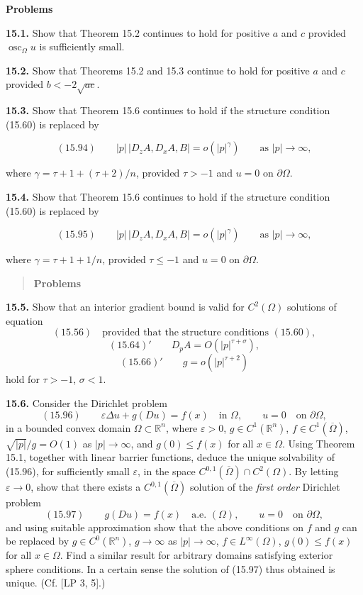 \textbf{Problems}

\medskip

\textbf{15.1.} Show that Theorem 15.2 continues to hold for positive $a$ and $c$ provided
$\operatorname{osc}_{\Omega} u$ is sufficiently small.

\medskip

\textbf{15.2.} Show that Theorems 15.2 and 15.3 continue to hold for positive $a$ and $c$
provided $b<-2\sqrt{ac}$.

\medskip

\textbf{15.3.} Show that Theorem 15.6 continues to hold if the structure condition (15.60)
is replaced by

\[
(15.94)\qquad |p|\,|D_z A, D_x A, B| = o(|p|^\gamma)\qquad \text{as } |p| \to \infty,
\]

where $\gamma = \tau + 1 + (\tau + 2)/n$, provided $\tau > -1$ and $u=0$ on $\partial\Omega$.

\medskip

\textbf{15.4.} Show that Theorem 15.6 continues to hold if the structure condition (15.60)
is replaced by

\[
(15.95)\qquad |p|\,|D_z A, D_x A, B| = o(|p|^\gamma)\qquad \text{as } |p| \to \infty,
\]

where $\gamma = \tau + 1 + 1/n$, provided $\tau \le -1$ and $u=0$ on $\partial\Omega$.


\begin{quote}
\textbf{Problems}
\end{quote}

\textbf{15.5.} Show that an interior gradient bound is valid for $C^2(\Omega)$ solutions of equation
\[
(15.56)\quad \text{provided that the structure conditions } (15.60),
\]
\[
(15.64)'\qquad D_p A = O(|p|^{\tau+\sigma}),
\]
\[
(15.66)'\qquad g = o(|p|^{\tau+2})
\]
hold for $\tau > -1$, $\sigma < 1$.

\textbf{15.6.} Consider the Dirichlet problem
\[
(15.96)\qquad \varepsilon \Delta u + g(Du) = f(x) \quad \text{in } \Omega,\qquad u = 0 \quad \text{on } \partial\Omega,
\]
in a bounded convex domain $\Omega \subset \mathbb{R}^n$, where $\varepsilon > 0$, $g \in C^1(\mathbb{R}^n)$, $f \in C^1(\overline{\Omega})$, $\sqrt{|p|}/g = O(1)$ as $|p| \to \infty$, and $g(0) \leq f(x)$ for all $x \in \Omega$. Using Theorem 15.1, together with linear barrier functions, deduce the unique solvability of (15.96), for sufficiently small $\varepsilon$, in the space $C^{0,1}(\overline{\Omega}) \cap C^2(\Omega)$. By letting $\varepsilon \to 0$, show that there exists a $C^{0,1}(\overline{\Omega})$ solution of the \textit{first order} Dirichlet problem
\[
(15.97)\qquad g(Du) = f(x) \quad \text{a.e. } (\Omega),\qquad u = 0 \quad \text{on } \partial\Omega,
\]
and using suitable approximation show that the above conditions on $f$ and $g$ can be replaced by $g \in C^0(\mathbb{R}^n)$, $g \to \infty$ as $|p| \to \infty$, $f \in L^\infty(\Omega)$, $g(0) \leq f(x)$ for all $x \in \Omega$. Find a similar result for arbitrary domains satisfying exterior sphere conditions. In a certain sense the solution of (15.97) thus obtained is unique. (Cf. [LP 3, 5].)


